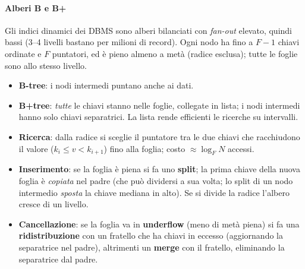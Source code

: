 \documentclass[12pt]{extarticle}
\begin{document}
\paragraph{Alberi B e B+}
Gli indici dinamici dei DBMS sono alberi bilanciati con \textit{fan-out} elevato, quindi bassi (3--4 livelli bastano per milioni di record). Ogni nodo ha fino a $F-1$ chiavi ordinate e $F$ puntatori, ed è pieno almeno a metà (radice esclusa); tutte le foglie sono allo stesso livello.
\begin{itemize}
    \item \textbf{B-tree}: i nodi intermedi puntano anche ai dati.
    \item \textbf{B+tree}: \emph{tutte} le chiavi stanno nelle foglie, collegate in lista; i nodi intermedi hanno solo chiavi separatrici. La lista rende efficienti le ricerche su intervalli.
\end{itemize}
\begin{itemize}
    \item \textbf{Ricerca}: dalla radice si sceglie il puntatore tra le due chiavi che racchiudono il valore ($k_i \le v < k_{i+1}$) fino alla foglia; costo $\approx \log_F N$ accessi.
    \item \textbf{Inserimento}: se la foglia è piena si fa uno \textbf{split}; la prima chiave della nuova foglia è \emph{copiata} nel padre (che può dividersi a sua volta; lo split di un nodo intermedio \emph{sposta} la chiave mediana in alto). Se si divide la radice l'albero cresce di un livello.
    \item \textbf{Cancellazione}: se la foglia va in \textbf{underflow} (meno di metà piena) si fa una \textbf{ridistribuzione} con un fratello che ha chiavi in eccesso (aggiornando la separatrice nel padre), altrimenti un \textbf{merge} con il fratello, eliminando la separatrice dal padre.
\end{itemize}
\end{document}
